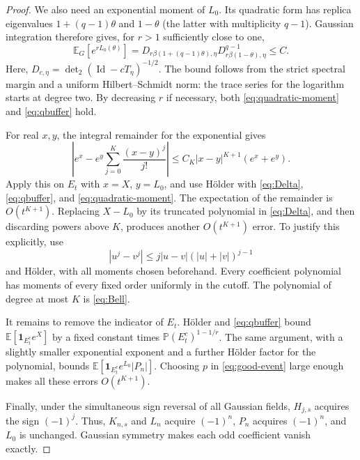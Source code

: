 \documentclass[11pt,reqno]{amsart}
\numberwithin{equation}{section}
\theoremstyle{plain}
\theoremstyle{definition}
\newcommand{\E}{\mathbb E}
\newcommand{\Pb}{\mathbb P}
\newcommand{\Id}{\operatorname{Id}}
\newcommand{\be}{\beta}
\begin{document}
\begin{proof}
We also need an exponential moment of $L_0$. Its quadratic form has replica eigenvalues $1+(q-1)\theta$ and $1-\theta$ (the latter with multiplicity $q-1$). Gaussian integration therefore gives, for $r>1$ sufficiently close to one,
\begin{equation}\label{eq:quadratic-moment}
 \E_G[e^{rL_0(\theta)}]
 =D_{r\be(1+(q-1)\theta),\eta}
  D_{r\be(1-\theta),\eta}^{q-1}\leq C.
\end{equation}
Here, $D_{c,\eta}=\det\nolimits_2(\Id-cT_\eta)^{-1/2}$. The bound follows from the strict spectral margin and a uniform Hilbert--Schmidt norm: the trace series for the logarithm starts at degree two. By decreasing $r$ if necessary, both \eqref{eq:quadratic-moment} and \eqref{eq:qbuffer} hold.

For real $x,y$, the integral remainder for the exponential gives
\begin{equation}\label{eq:expTaylor}
 \left|e^x-e^y\sum_{j=0}^{K}\frac{(x-y)^j}{j!}\right|
 \leq C_K|x-y|^{K+1}(e^x+e^y).
\end{equation}
Apply this on $E_t$ with $x=X$, $y=L_0$, and use H\"older with \eqref{eq:Delta}, \eqref{eq:qbuffer}, and \eqref{eq:quadratic-moment}. The expectation of the remainder is $O(t^{K+1})$. Replacing $X-L_0$ by its truncated polynomial in \eqref{eq:Delta}, and then discarding powers above $K$, produces another $O(t^{K+1})$ error. To justify this explicitly, use
\begin{equation}\label{eq:power-difference}
 |u^j-v^j|\leq j|u-v|(|u|+|v|)^{j-1}
\end{equation}
and H\"older, with all moments chosen beforehand. Every coefficient polynomial has moments of every fixed order uniformly in the cutoff. The polynomial of degree at most $K$ is \eqref{eq:Bell}.

It remains to remove the indicator of $E_t$. H\"older and \eqref{eq:qbuffer} bound $\E[\mathbf1_{E_t^c}e^X]$ by a fixed constant times $\Pb(E_t^c)^{1-1/r}$. The same argument, with a slightly smaller exponential exponent and a further H\"older factor for the polynomial, bounds $\E[\mathbf1_{E_t^c}e^{L_0}|P_n|]$. Choosing $p$ in \eqref{eq:good-event} large enough makes all these errors $O(t^{K+1})$.

Finally, under the simultaneous sign reversal of all Gaussian fields, $H_{j,s}$ acquires the sign $(-1)^j$. Thus, $K_{n,s}$ and $L_n$ acquire $(-1)^n$, $P_n$ acquires $(-1)^n$, and $L_0$ is unchanged. Gaussian symmetry makes each odd coefficient vanish exactly.
\end{proof}
\end{document}

